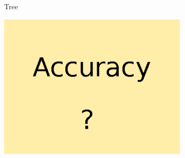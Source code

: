 \documentclass[conference]{IEEEtran}
\begin{document}
\begin{spacing}{0.9}
\begin{figure}
\begin{subfigure}{.15\textwidth}
  \caption{Tree}
\end{subfigure}
\begin{subfigure}{.15\textwidth}
  \centering
  \includegraphics[scale=0.3]{Accuracy.ps}
\end{subfigure}



\end{figure}
\end{spacing}
\end{document}
